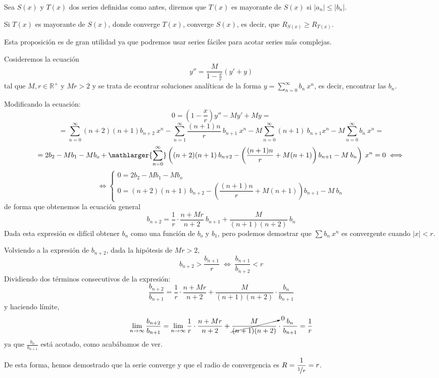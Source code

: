 \begin{defi}
    Sea $S(x)$ y $T(x)$ dos series definidas como antes, diremos que $T(x)$ es mayorante de $S(x)$ si $|a_n|\leq |b_n|$. 
\end{defi}
\begin{prop}
    Si $T(x)$ es mayorante de $S(x)$, donde converge $T(x)$, converge $S(x)$, es decir, que $R_{S(x)} \geq R_{T(x)}$.
\end{prop}
\begin{cor}
Esta proposición es de gran utilidad ya que podremos usar series fáciles para acotar series más complejas.
\end{cor}

\begin{lem}
    Cosideremos la ecuación $$y''=\dfrac{M}{1-\frac{x}{r}}(y'+y)$$
    tal que $M,r \in \mathbb R^+$ y $Mr > 2$ y se trata de econtrar soluciones analíticas de la forma $\displaystyle y=\sum_{n=0}^{\infty} b_n \: x^n$, es decir, encontrar las $b_n$. 
\end{lem}
\begin{dem}
    Modificando la ecuación:
    $$0=\left(1-\dfrac{x}{r}\right) y''-My'+My=$$
    $$=\sum_{n=0}^{\infty} (n+2)(n+1)b_{n+2} \: x^n - \sum_{n=1}^{\infty} \dfrac{(n+1)n}{r} \: b_{n+1} \:  x^n - M \sum_{n=0}^{\infty} (n+1) \: b_{n+1} x^n- M \sum_{n=0}^{\infty} b_n \: x^n=$$
    $$=2b_2-Mb_1-Mb_o+\mathlarger{\sum_{n=0}^{\infty}}\left( (n+2)(n+1)\: b_{n+2} - \left(\dfrac{(n+1)n}{r}+M(n+1) \right)b_{n+1}-M\: b_n\right) \: x^n=0 \iff$$
    $$\iff \begin{cases}
        0=2b_2-Mb_1-Mb_o \\
        0=(n+2)(n+1)\: b_{n+2} - \left(\dfrac{(n+1)n}{r}+M(n+1) \right)b_{n+1}-M\: b_n
    \end{cases}$$
    de forma que obtenemos la ecuación general
    $$b_{n+2}=\dfrac{1}{r} \cdot \dfrac{n+Mr}{n+2} \: b_{n+1} + \dfrac{M}{(n+1)(n+2)} \: b_n$$
    Dada esta expresión es difícil obtener $b_n$ como una función de $b_o$ y $b_1$, pero podemos demostrar que $\sum b_n \: x^n$ es convergente cuando $|x|<r$. 

    Volviendo a la expresión de $b_{n+2}$, dada la hipótesis de $Mr>2$, $$b_{n+2}>\dfrac{b_{n+1}}{r} \; \iff \; \dfrac{b_{n+1}}{b_{n+2}}<r$$
    Dividiendo dos términos consecutivos de la expresión:
    $$\dfrac{b_{n+2}}{b_{n+1}}=\dfrac{1}{r} \cdot \dfrac{n+Mr}{n+2}+\dfrac{M}{(n+1)(n+2)} \cdot \dfrac{b_n}{b_{n+1}}$$
    y haciendo límite,
    $$\lim_{n \to \infty} \dfrac{b_{n+2}}{b_{n+1}}=\lim_{n \to \infty} \dfrac{1}{r} \cdot \dfrac{n+Mr}{n+2}+\cancelto{0}{\dfrac{M}{(n+1)(n+2)}} \cdot \dfrac{b_n}{b_{n+1}} = \dfrac{1}{r}$$
    ya que $ \frac{b_n}{b_{n+1}}$ está acotado, como acabábamos de ver.

    De esta forma, hemos demostrado que la serie converge y que el radio de convergencia es $R=\dfrac{1}{\nicefrac{1}{r}}=r$.
\end{dem}

